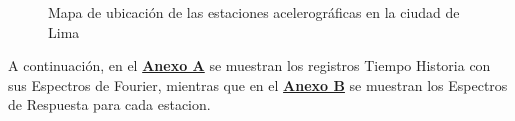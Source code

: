 \documentclass[11pt, a4paper]{report}
\begin{document}
\begin{figure}[!h]
    \centering
            \caption{Mapa de ubicación de las estaciones acelerográficas en la ciudad de Lima}
            \label{fig:fig02}
            \setlength\fboxsep{0pt}
            \setlength\fboxrule{0.3pt}
\end{figure}

\vspace{1cm}

\noindent
A continuación, en el \hyperlink{anexoA}{\textbf{Anexo A}} se muestran los registros Tiempo Historia con sus Espectros de Fourier, mientras que
en el \hyperlink{anexoB}{\textbf{Anexo B}} se muestran los Espectros de Respuesta para cada estacion.

\newpage

\clearpage

\vspace*{\fill}%
\noindent
{}
\vfill
\end{document}
